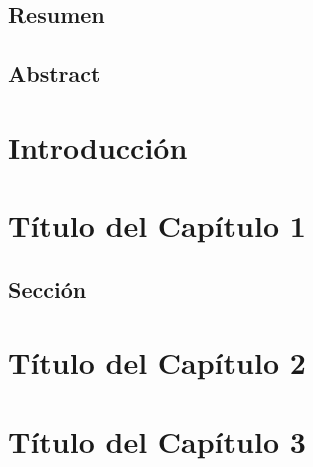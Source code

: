 \documentclass[11pt,a4paper]{book}
\theoremstyle{definition}
\theoremstyle{remark}
\begin{document}
\section*{Resumen}





\vspace{1.5cm}

\section*{Abstract}






\clearpage

\thispagestyle{empty}


\chapter*{Introducci\'on}



\mainmatter


\chapter{Título del Capítulo 1}



\section{Sección}



\chapter{Título del Capítulo 2}




\chapter{Título del Capítulo 3}
\end{document}
